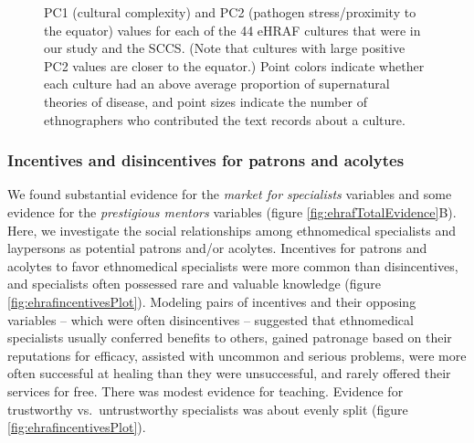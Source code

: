 \documentclass[
  11pt,
]{article}
\begin{document}
\begin{landscape}
\begin{figure}[p]
{}

\caption{PC1 (cultural complexity) and PC2 (pathogen stress/proximity to the equator) values for each of the 44 eHRAF cultures that were in our study and the SCCS. (Note that cultures with large positive PC2 values are closer to the equator.) Point colors indicate whether each culture had an above average proportion of supernatural theories of disease, and point sizes indicate the number of ethnographers who contributed the text records about a culture.}\label{fig:sccsBiplot}
\end{figure}


\end{landscape}

\hypertarget{incentives-and-disincentives-for-patrons-and-acolytes}{%
\subsubsection{Incentives and disincentives for patrons and acolytes}\label{incentives-and-disincentives-for-patrons-and-acolytes}}

We found substantial evidence for the \emph{market for specialists} variables and some evidence for the \emph{prestigious mentors} variables (figure \ref{fig:ehrafTotalEvidence}B). Here, we investigate the social relationships among ethnomedical specialists and laypersons as potential patrons and/or acolytes. Incentives for patrons and acolytes to favor ethnomedical specialists were more common than disincentives, and specialists often possessed rare and valuable knowledge (figure \ref{fig:ehrafincentivesPlot}). Modeling pairs of incentives and their opposing variables -- which were often disincentives -- suggested that ethnomedical specialists usually conferred benefits to others, gained patronage based on their reputations for efficacy, assisted with uncommon and serious problems, were more often successful at healing than they were unsuccessful, and rarely offered their services for free. There was modest evidence for teaching. Evidence for trustworthy vs.~untrustworthy specialists was about evenly split (figure \ref{fig:ehrafincentivesPlot}).
\end{document}
